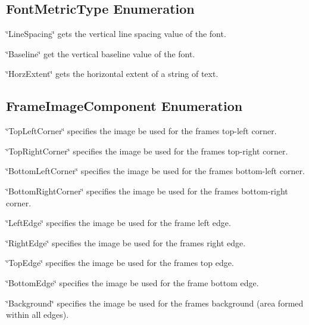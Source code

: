 \hypertarget{fal_enum_ref_fal_enum_ref_sec_3}{}\subsection{Font\+Metric\+Type Enumeration}\label{fal_enum_ref_fal_enum_ref_sec_3}
\begin{DoxyItemize}
\item {\ttfamily \char`\"{}\+Line\+Spacing\char`\"{}} gets the vertical line spacing value of the font. \item {\ttfamily \char`\"{}\+Baseline\char`\"{}} get the vertical baseline value of the font. \item {\ttfamily \char`\"{}\+Horz\+Extent\char`\"{}} gets the horizontal extent of a string of text.\end{DoxyItemize}
\hypertarget{fal_enum_ref_fal_enum_ref_sec_4}{}\subsection{Frame\+Image\+Component Enumeration}\label{fal_enum_ref_fal_enum_ref_sec_4}
\begin{DoxyItemize}
\item {\ttfamily \char`\"{}\+Top\+Left\+Corner\char`\"{}} specifies the image be used for the frame\textquotesingle{}s top-\/left corner. \item {\ttfamily \char`\"{}\+Top\+Right\+Corner\char`\"{}} specifies the image be used for the frame\textquotesingle{}s top-\/right corner. \item {\ttfamily \char`\"{}\+Bottom\+Left\+Corner\char`\"{}} specifies the image be used for the frame\textquotesingle{}s bottom-\/left corner. \item {\ttfamily \char`\"{}\+Bottom\+Right\+Corner\char`\"{}} specifies the image be used for the frame\textquotesingle{}s bottom-\/right corner. \item {\ttfamily \char`\"{}\+Left\+Edge\char`\"{}} specifies the image be used for the frame\textquotesingle{} left edge. \item {\ttfamily \char`\"{}\+Right\+Edge\char`\"{}} specifies the image be used for the frame\textquotesingle{}s right edge. \item {\ttfamily \char`\"{}\+Top\+Edge\char`\"{}} specifies the image be used for the frame\textquotesingle{}s top edge. \item {\ttfamily \char`\"{}\+Bottom\+Edge\char`\"{}} specifies the image be used for the frame bottom edge. \item {\ttfamily \char`\"{}\+Background\char`\"{}} specifies the image be used for the frame\textquotesingle{}s background (area formed within all edges).\end{DoxyItemize}
